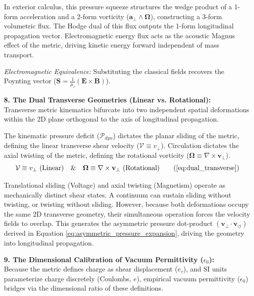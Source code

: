 In exterior calculus, this pressure squeeze structures the wedge product of a 1-form acceleration and a 2-form vorticity ($\mathbf{a}_\perp \wedge \boldsymbol{\Omega}$), constructing a 3-form volumetric flux. The Hodge dual of this flux outputs the 1-form longitudinal propagation vector. Electromagnetic energy flux acts as the acoustic Magnus effect of the metric, driving kinetic energy forward independent of mass transport. 
\vspace{0.2 cm}

\textit{Electromagnetic Equivalence:} Substituting the classical fields recovers the Poynting vector ($\mathbf{S} = \frac{1}{\mu_\tau}(\mathbf{E} \times \mathbf{B})$).

\vspace{0.2 cm}

\textbf{8. The Dual Transverse Geometries (Linear vs. Rotational):} \\
Transverse metric kinematics bifurcate into two independent spatial deformations within the 2D plane orthogonal to the axis of longitudinal propagation. 

The kinematic pressure deficit ($\mathcal{P}_{dyn}$) dictates the planar sliding of the metric, defining the linear transverse shear velocity ($\mathcal{V} \equiv v_{\perp}$). Circulation dictates the axial twisting of the metric, defining the rotational vorticity ($\boldsymbol{\Omega} \equiv \nabla \times \mathbf{v}_{\perp}$). 
\begin{equation}
    \mathcal{V} \equiv v_{\perp} \text{ (Linear)} \quad \text{\&} \quad \boldsymbol{\Omega} \equiv \nabla \times \mathbf{v}_{\perp} \text{ (Rotational)} \tag{\ref{eq:dual_transverse}}
\end{equation}

Translational sliding (Voltage) and axial twisting (Magnetism) operate as mechanically distinct shear states. A continuum can sustain sliding without twisting, or twisting without sliding. However, because both deformations occupy the same 2D transverse geometry, their simultaneous operation forces the velocity fields to overlap. This generates the asymmetric pressure dot-product $(\mathbf{v}_\perp \cdot \mathbf{v}_\circlearrowleft)$ derived in Equation \ref{eq:asymmetric_pressure_expansion}, driving the geometry into longitudinal propagation.

\vspace{0.2 cm}

\textbf{9. The Dimensional Calibration of Vacuum Permittivity ($\epsilon_0$):} \\
Because the metric defines charge as shear displacement ($e_{\tau}$), and SI units parameterize charge discretely (Coulombs, $e$), empirical vacuum permittivity ($\epsilon_0$) bridges via the dimensional ratio of these definitions. 

